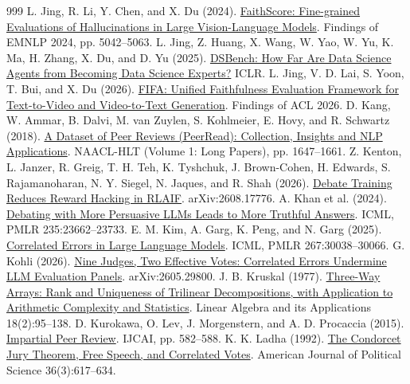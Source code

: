 \documentclass[12pt,letterpaper]{article}
\begin{document}
\begin{thebibliography}{999}
 L. Jing, R. Li, Y. Chen, and X. Du (2024). \href{https://doi.org/10.18653/v1/2024.findings-emnlp.290}{FaithScore: Fine-grained Evaluations of Hallucinations in Large Vision-Language Models}. Findings of EMNLP 2024, pp. 5042--5063.
 L. Jing, Z. Huang, X. Wang, W. Yao, W. Yu, K. Ma, H. Zhang, X. Du, and D. Yu (2025). \href{https://arxiv.org/abs/2409.07703}{DSBench: How Far Are Data Science Agents from Becoming Data Science Experts?} ICLR.
 L. Jing, V. D. Lai, S. Yoon, T. Bui, and X. Du (2026). \href{https://arxiv.org/abs/2507.06523}{FIFA: Unified Faithfulness Evaluation Framework for Text-to-Video and Video-to-Text Generation}. Findings of ACL 2026.
 D. Kang, W. Ammar, B. Dalvi, M. van Zuylen, S. Kohlmeier, E. Hovy, and R. Schwartz (2018). \href{https://doi.org/10.18653/v1/N18-1149}{A Dataset of Peer Reviews (PeerRead): Collection, Insights and NLP Applications}. NAACL-HLT (Volume 1: Long Papers), pp. 1647--1661.
 Z. Kenton, L. Janzer, R. Greig, T. H. Teh, K. Tyshchuk, J. Brown-Cohen, H. Edwards, S. Rajamanoharan, N. Y. Siegel, N. Jaques, and R. Shah (2026). \href{https://arxiv.org/abs/2608.17776}{Debate Training Reduces Reward Hacking in RLAIF}. arXiv:2608.17776.
 A. Khan et al. (2024). \href{https://proceedings.mlr.press/v235/khan24a.html}{Debating with More Persuasive LLMs Leads to More Truthful Answers}. ICML, PMLR 235:23662--23733.
 E. M. Kim, A. Garg, K. Peng, and N. Garg (2025). \href{https://proceedings.mlr.press/v267/kim25e.html}{Correlated Errors in Large Language Models}. ICML, PMLR 267:30038--30066.
 G. Kohli (2026). \href{https://arxiv.org/abs/2605.29800}{Nine Judges, Two Effective Votes: Correlated Errors Undermine LLM Evaluation Panels}. arXiv:2605.29800.
 J. B. Kruskal (1977). \href{https://doi.org/10.1016/0024-3795(77)90069-6}{Three-Way Arrays: Rank and Uniqueness of Trilinear Decompositions, with Application to Arithmetic Complexity and Statistics}. Linear Algebra and its Applications 18(2):95--138.
 D. Kurokawa, O. Lev, J. Morgenstern, and A. D. Procaccia (2015). \href{https://www.ijcai.org/Abstract/15/088}{Impartial Peer Review}. IJCAI, pp. 582--588.
 K. K. Ladha (1992). \href{https://doi.org/10.2307/2111584}{The Condorcet Jury Theorem, Free Speech, and Correlated Votes}. American Journal of Political Science 36(3):617--634.

\end{thebibliography}
\end{document}

